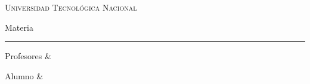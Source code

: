 \usepackage{graphicx}

\begin{title}

\begin{center}

{\Huge \scshape Universidad Tecnológica Nacional}

\bigskip

{\LARGE Materia}
\end{center}

\hrule

\begin{minipage}

Profesores &

Alumno &

\end{minipage}

\end{title}
